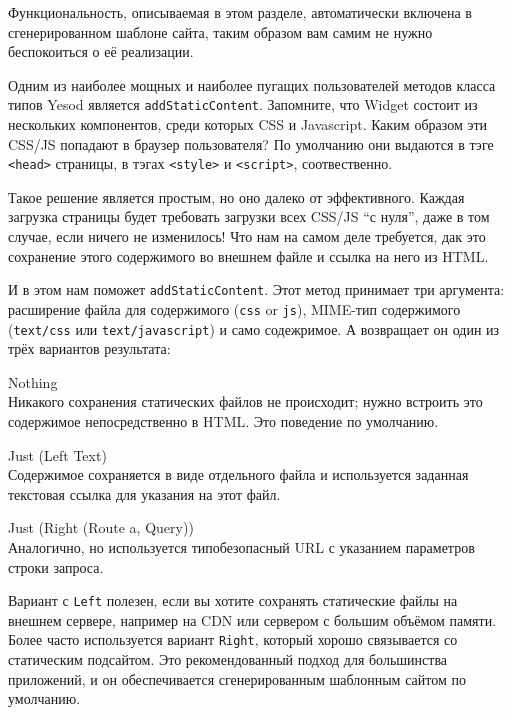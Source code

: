 \begin{remark}
Функциональность, описываемая в этом разделе, автоматически включена в сгенерированном шаблоне сайта, таким образом вам самим не нужно беспокоиться о её реализации.
\end{remark}

Одним из наиболее мощных и наиболее пугащих пользователей методов класса типов Yesod является \lstinline!addStaticContent!. Запомните, что Widget состоит из нескольких компонентов, среди которых CSS и Javascript. Каким образом эти CSS/JS попадают в браузер пользователя? По умолчанию они выдаются в тэге \lstinline!<head>! страницы, в тэгах \lstinline!<style>! и \lstinline!<script>!, соотвественно.

Такое решение является простым, но оно далеко от эффективного. Каждая загрузка страницы будет требовать загрузки всех CSS/JS ``с нуля'', даже в том случае, если ничего не изменилось! Что нам на самом деле требуется, дак это сохранение этого содержимого во внешнем файле и ссылка на него из HTML.

И в этом нам поможет \lstinline!addStaticContent!. Этот метод принимает три аргумента: расширение файла для содержимого (\lstinline!css! or \lstinline!js!), MIME-тип содержимого (\lstinline!text/css! или \lstinline!text/javascript!) и само содежримое. А возвращает он один из трёх вариантов результата:

\begin{description}
  \item {Nothing}  \hfill \\
    Никакого сохранения статических файлов не происходит; нужно встроить это содержимое непосредственно в HTML. Это поведение по умолчанию.
  \item {Just (Left Text)} \hfill \\
    Содержимое сохраняется в виде отдельного файла и используется заданная текстовая ссылка для указания на этот файл.
  \item {Just (Right (Route a, Query))} \hfill \\
    Аналогично, но используется типобезопасный URL с указанием параметров строки запроса.
\end{description}

Вариант с \lstinline!Left! полезен, если вы хотите сохранять статические файлы на внешнем сервере, например на CDN или сервером с большим объёмом памяти. Более часто используется вариант \lstinline!Right!, который хорошо связывается со статическим подсайтом. Это рекомендованный подход для большинства приложений, и он обеспечивается сгенерированным шаблонным сайтом по умолчанию.

